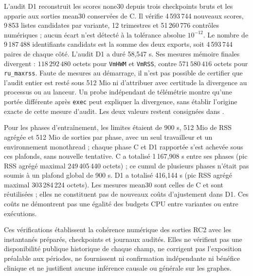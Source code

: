 L'audit D1 reconstruit les scores none30 depuis trois checkpoints bruts et les apparie aux sorties mean30 conservées de C. Il vérifie 4\,593\,744 nouveaux scores, 9\,853 listes candidates par variante, 12 trimestres et 51\,260\,776 contrôles numériques ; aucun écart n'est détecté à la tolérance absolue $10^{-12}$. Le nombre de 9\,187\,488 identifiants candidats est la somme des deux exports, soit 4\,593\,744 paires de chaque côté. L'audit D1 a duré 58,547 s. Ses mesures mémoire finales divergent : $118\,292\,480$ octets pour \texttt{VmHWM} et \texttt{VmRSS}, contre $571\,580\,416$ octets pour \texttt{ru\_maxrss}. Faute de mesures au démarrage, il n'est pas possible de certifier que l'audit entier est resté sous 512 Mio ni d'attribuer avec certitude la divergence au processus ou au lanceur. Un probe indépendant de télémétrie montre qu'une portée différente après \texttt{exec} peut expliquer la divergence, sans établir l'origine exacte de cette mesure d'audit. Les deux valeurs restent consignées dans .

Pour les phases d'entraînement, les limites étaient de 900 s, 512 Mio de RSS agrégée et 512 Mio de sorties par phase, avec un seul travailleur et un environnement monothread ; chaque phase C et D1 rapportée s'est achevée sous ces plafonds, sans nouvelle tentative. C a totalisé 1\,167,908 s entre ses phases (pic RSS agrégé maximal 249\,405\,440 octets) ; ce cumul de plusieurs phases n'était pas soumis à un plafond global de 900 s. D1 a totalisé 416,144 s (pic RSS agrégé maximal 303\,284\,224 octets). Les mesures mean30 sont celles de C et sont réutilisées ; elles ne constituent pas de nouveaux coûts d'ajustement dans D1. Ces coûts ne démontrent pas une égalité des budgets CPU entre variantes ou entre exécutions.

Ces vérifications établissent la cohérence numérique des sorties RC2 avec les instantanés préparés, checkpoints et journaux audités. Elles ne vérifient pas une disponibilité publique historique de chaque champ, ne corrigent pas l'exposition préalable aux périodes, ne fournissent ni confirmation indépendante ni bénéfice clinique et ne justifient aucune inférence causale ou générale sur les graphes.
